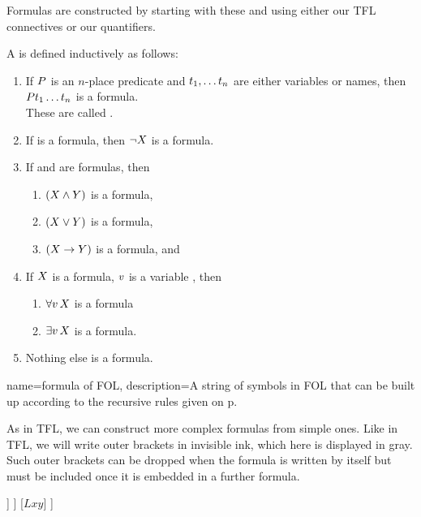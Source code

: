 Formulas are constructed by starting with these and using either our TFL connectives or our quantifiers.

	\begin{definition}\label{FOLformula}A  is defined inductively as follows:
	\begin{enumerate}
		\item If $P$ is an $n$-place predicate and $t_1,\ldots t_n$ are either variables or names, then $Pt_1\ldots t_n$ is a formula.\\These are called .
		\item If \metaX is a formula, then $\neg X$ is a formula.
		\item If \metaX and \metaY are formulas, then \begin{enumerate}
		\item $(X\mathbin{\wedge}Y)$ is a formula,
		\item $(X\vee Y)$ is a formula,
		\item $(X\rightarrow Y)$ is a formula, and
		\end{enumerate}
		\item\label{item:quantifiers}
		 If $X$ is a formula, $v$ is a variable , then \begin{enumerate}
		 \item $\forall v\,X$ is a formula
		 \item $\exists v\,X$ is a formula.
		 \end{enumerate}
		\item Nothing else is a formula.
	\end{enumerate}
	\end{definition}
	{
	name=formula of FOL,
	description={A string of symbols in FOL that can be built up according to the recursive rules given on p.~\pageref{FOLformula}}
	}
	
	As in TFL, we can construct more complex formulas from simple ones. Like in TFL, we will write outer brackets in invisible ink, which here is displayed in gray. Such outer brackets can be dropped when the formula is written by itself but must be included once it is embedded in a further formula. 
	
\begin{center}
	\begin{forest}
	[$\almostinvisibleopenbracket\ldots \eif \ldots\almostinvisibleclosebracket$
		[$\enot \ldots$
			[$\almostinvisibleopenbracket\ldots \eand \ldots\almostinvisibleclosebracket$
				[$Dx$]
				[$Db$]
			]
		]
		[$Lxy$]
	]
	\end{forest}
\end{center}
	
